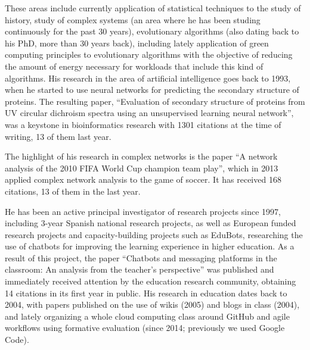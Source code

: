 \documentclass[a4paper,12pt]{article}
\begin{document}
These areas include currently application of statistical techniques to the study of history, study of complex systems (an area where he has been studing continuously for the past 30 years), evolutionary algorithms (also dating back to his PhD, more than 30 years back), including lately application of green computing principles to evolutionary algorithms with the objective of reducing the amount of energy necessary for workloads that include this kind of algorithms. His research in the area of artificial intelligence goes back to 1993, when he started to use neural networks for predicting the secondary structure of proteins. The resulting paper, ``Evaluation of secondary structure of proteins from UV circular dichroism spectra using an unsupervised learning neural network'', was a keystone in bioinformatics research with 1301 citations at the time of writing, 13 of them last year.

The highlight of his research in complex networks is the paper ``A network analysis of the 2010 FIFA World Cup champion team play'', which in 2013 applied complex network analysis to the game of soccer. It has received 168 citations, 13 of them in the last year.

He has been an active principal investigator of research projects since 1997,
including 3-year Spanish national research projects, as well as European funded
research projects and capacity-building projects such as EduBots, researching
the use of chatbots for improving the learning experience in higher
education. As a result of this project, the paper ``Chatbots and messaging
platforms in the classroom: An analysis from the teacher’s perspective'' was
published and immediately received attention by the education research
community, obtaining 14 citations in its first year in public. His research in
education dates back to 2004, with papers published on the use of wikis (2005) and
blogs in class (2004), and lately organizing a whole cloud computing class around
GitHub and agile workflows using formative evaluation (since 2014; previously we
used Google Code).

\end{document}
